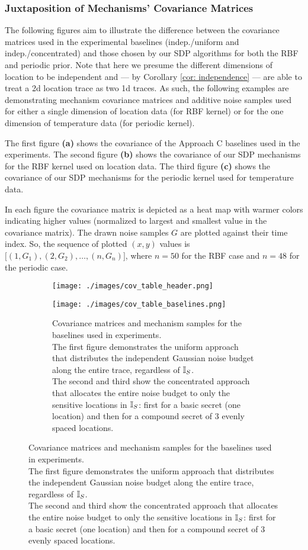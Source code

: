 \subsubsection{Juxtaposition of Mechanisms' Covariance Matrices}
\label{apx: juxtaposition}
The following figures aim to illustrate the difference between the covariance matrices used in the experimental baselines (indep./uniform and indep./concentrated) and those chosen by our SDP algorithms for both the RBF and periodic prior. Note that here we presume the different dimensions of location to be independent and --- by Corollary \ref{cor: independence} --- are able to treat a 2d location trace as two 1d traces. As such, the following examples are demonstrating mechanism covariance matrices and additive noise samples used for either a single dimension of location data (for RBF kernel) or for the one dimension of temperature data (for periodic kernel). 

The first figure \textbf{(a)} shows the covariance of the Approach C baselines used in the experiments. The second figure \textbf{(b)} shows the covariance of our SDP mechanisms for the RBF kernel used on location data. The third figure \textbf{(c)} shows the covariance of our SDP mechanisms for the periodic kernel used for temperature data. 

In each figure the covariance matrix is depicted as a heat map with warmer colors indicating higher values (normalized to largest and smallest value in the covariance matrix). The drawn noise samples $G$ are plotted against their time index. So, the sequence of plotted $(x,y)$ values is $\big[(1, G_1), (2, G_2), \dots, (n, G_n)\big]$, where $n = 50$ for the RBF case and $n = 48$ for the periodic case. 

\begin{figure*}[h]
	\centering
	\begin{subfigure}[b]{1\textwidth}
		\centering
		\texttt{[image: ./images/cov\_table\_header.png]}
	\end{subfigure}
	\begin{subfigure}[b]{1\textwidth}
		\centering
		\texttt{[image: ./images/cov\_table\_baselines.png]}
		\caption[Covariance matrices and mechanism samples for the baselines used in experiments.]{Covariance matrices and mechanism samples for the baselines used in experiments. 
		\vspace{2mm}\\
		The first figure demonstrates the uniform approach that distributes the independent Gaussian noise budget along the entire trace, regardless of ${\mathbb{I}_S}$. 
		\vspace{2mm}\\
		The second and third show the concentrated approach that allocates the entire noise budget to only the sensitive locations in ${\mathbb{I}_S}$: first for a basic secret (one location) and then for a compound secret of 3 evenly spaced locations.} 
		\label{fig: cov table baselines}
	\end{subfigure}
\end{figure*}


